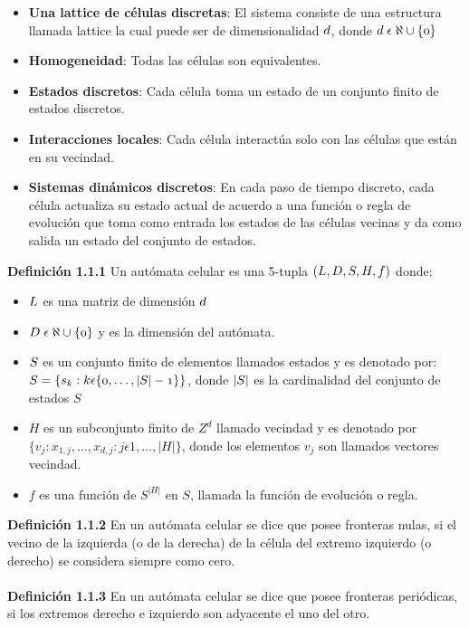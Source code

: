 \begin{itemize}
	\item{\textbf{Una lattice de células discretas}: El sistema consiste de una estructura llamada lattice la cual puede ser de dimensionalidad  $\mathnormal{d}$, donde $\mathnormal{d\; \epsilon\; \aleph\cup\{0\}}$}
	\item{\textbf{Homogeneidad}: Todas las células son equivalentes.}
	\item{\textbf{Estados discretos}: Cada célula toma un estado de un conjunto finito de estados discretos.}
	\item{\textbf{Interacciones locales}: Cada célula interactúa solo con las células que están en su vecindad.}
	\item{\textbf{Sistemas dinámicos discretos}: En cada paso de tiempo discreto, cada célula actualiza su estado actual de acuerdo a una función o regla de evolución que toma como entrada los estados de las células vecinas y da como salida un estado del conjunto de estados.}
\end{itemize}

\textbf{Definición 1.1.1} Un autómata celular es una 5-tupla $\mathnormal{(L, D, S, H, f)}$ donde:
\begin{itemize}
	\item $\mathnormal{L}$ es una matriz de dimensión $\mathnormal{d}$
	\item $\mathnormal{D\; \epsilon\; \aleph\cup\{0\}}$ y es la dimensión del autómata.
	\item $\mathnormal{S}$ es un conjunto finito de elementos llamados estados y es denotado por:
	\\
	$\mathnormal{S=\{s_{k}:k \epsilon \{0,\dots,|S|-1\}\}}$, donde $\mathnormal{|S|}$ es la cardinalidad del conjunto de estados $S$
	\item $H$ es un subconjunto finito de $Z^{d}$ llamado vecindad y es denotado por $\{v_{j}:x_{1,j},\dots,x_{d,j}:j\epsilon1,\dots,|H|\}$, donde los elementos $v_{j}$ son llamados vectores vecindad.
	\item $f$ es una función de $S^{|H|}$ en $S$, llamada la función de evolución o regla.
\end{itemize}
\textbf{Definición 1.1.2} En un autómata celular se dice que posee fronteras nulas, si el vecino de la izquierda (o de la derecha) de la célula del extremo izquierdo (o derecho) se considera siempre como cero.
\\
\\
\textbf{Definición 1.1.3} En un autómata celular se dice que posee fronteras periódicas, si los extremos derecho
e izquierdo son adyacente el uno del otro.

